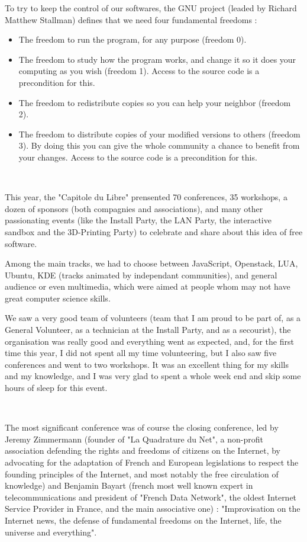 \documentclass[DIV=calc, paper=a4, fontsize=11pt, twocolumn]{scrartcl} %
\begin{document}
To try to keep the control of our softwares, the GNU project (leaded by Richard Matthew Stallman) defines that we need four fundamental freedoms :

\begin{itemize}
    \item The freedom to run the program, for any purpose (freedom 0).
    \item The freedom to study how the program works, and change it so it does your computing as you wish (freedom 1). Access to the source code is a precondition for this.
    \item The freedom to redistribute copies so you can help your neighbor (freedom 2).
    \item The freedom to distribute copies of your modified versions to others (freedom 3). By doing this you can give the whole community a chance to benefit from your changes. Access to the source code is a precondition for this.
\end{itemize}

~


This year, the "Capitole du Libre" prensented 70 conferences, 35 workshops, a dozen of sponsors (both compagnies and associations), and many other passionating events (like the Install Party, the LAN Party, the interactive sandbox and the 3D-Printing Party) to celebrate and share about this idea of free software.

Among the main tracks, we had to choose between JavaScript, Openstack, LUA, Ubuntu, KDE (tracks animated by independant communities), and general audience or even multimedia, which were aimed at people whom may not have great computer science skills.

We saw a very good team of volunteers (team that I am proud to be part of, as a General Volunteer, as a technician at the Install Party, and as a secourist), the organisation was really good and everything went as expected, and, for the first time this year, I did not spent all my time volunteering, but I also saw five conferences and went to two workshops.
It was an excellent thing for my skills and my knowledge, and I was very glad to spent a whole week end and skip some hours of sleep for this event.

~

The most significant conference was of course the closing conference, led by Jeremy Zimmermann (founder of "La Quadrature du Net", a non-profit association defending the rights and freedoms of citizens on the Internet, by advocating for the adaptation of French and European legislations to respect the founding principles of the Internet, and most notably the free circulation of knowledge) and Benjamin Bayart (french most well known expert in telecommunications and president of "French Data Network", the oldest Internet Service Provider in France, and the main associative one) : "Improvisation on the Internet news, the defense of fundamental freedoms on the Internet, life, the universe and everything".
\end{document}
